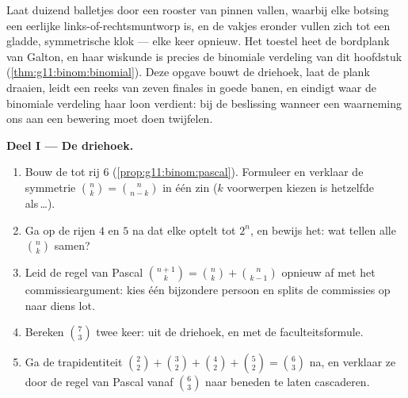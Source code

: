 \begin{problem}
\label{pb:g11:binom:1}
Laat duizend balletjes door een rooster van pinnen vallen, waarbij elke
botsing een eerlijke links-of-rechtsmuntworp is, en de vakjes eronder vullen
zich tot een gladde, symmetrische klok --- elke keer opnieuw. Het toestel
heet de bordplank van Galton, en haar wiskunde is precies de binomiale
verdeling van dit hoofdstuk (\cref{thm:g11:binom:binomial}). Deze opgave
bouwt de driehoek, laat de plank draaien, leidt een reeks van zeven finales
in goede banen, en eindigt waar de binomiale verdeling haar loon verdient:
bij de beslissing wanneer een waarneming ons aan een bewering moet doen
twijfelen.

\medskip
\noindent\textbf{Deel I --- De driehoek.}
\begin{enumerate}
  \item Bouw de  tot rij $6$
        (\cref{prop:g11:binom:pascal}). Formuleer en verklaar de symmetrie
        $\binom nk = \binom{n}{n-k}$ in één zin ($k$ voorwerpen kiezen is
        hetzelfde als\,\dots).
  \item Ga op de rijen $4$ en $5$ na dat elke  optelt tot $2^n$, en bewijs
        het: wat tellen alle $\binom nk$ samen?
  \item Leid de regel van Pascal $\binom{n+1}{k} = \binom nk +
        \binom{n}{k-1}$ opnieuw af met het commissieargument: kies één
        bijzondere persoon en splits de commissies op naar diens lot.
  \item Bereken $\binom73$ twee keer: uit de driehoek, en met de
        faculteitsformule.
  \item Ga de trapidentiteit
        $\binom22 + \binom32 + \binom42 + \binom52 = \binom63$ na, en verklaar
        ze door de regel van Pascal vanaf $\binom63$ naar beneden te laten
        cascaderen.
\end{enumerate}


\end{problem}
